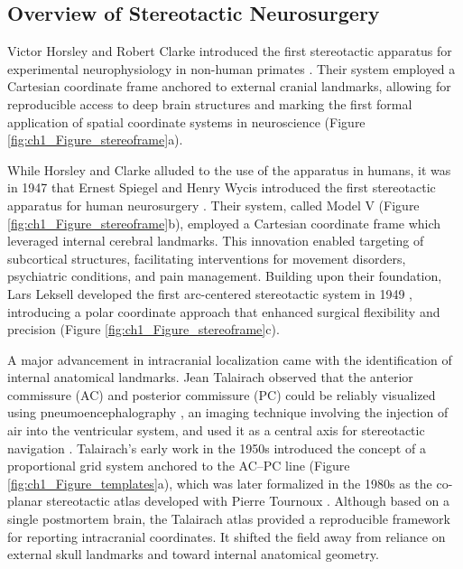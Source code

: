 \subsection{Overview of Stereotactic Neurosurgery}
Victor Horsley and Robert Clarke introduced the first stereotactic apparatus for experimental neurophysiology in non-human primates \cite{Horsley1908-om}. Their system employed a Cartesian coordinate frame anchored to external cranial landmarks, allowing for reproducible access to deep brain structures and marking the first formal application of spatial coordinate systems in neuroscience (Figure \ref{fig:ch1_Figure_stereoframe}a).

While Horsley and Clarke alluded to the use of the apparatus in humans, it was in 1947 that Ernest Spiegel and Henry Wycis introduced the first stereotactic apparatus for human neurosurgery \cite{Spiegel1947-rq}. Their system, called Model V (Figure \ref{fig:ch1_Figure_stereoframe}b), employed a Cartesian coordinate frame which leveraged internal cerebral landmarks. This innovation enabled targeting of subcortical structures, facilitating interventions for movement disorders, psychiatric conditions, and pain management. Building upon their foundation, Lars Leksell developed the first arc-centered stereotactic system in 1949 \cite{Leksell1949-wl}, introducing a polar coordinate approach that enhanced surgical flexibility and precision (Figure \ref{fig:ch1_Figure_stereoframe}c).

A major advancement in intracranial localization came with the identification of internal anatomical landmarks. Jean Talairach observed that the anterior commissure (AC) and posterior commissure (PC) could be reliably visualized using pneumoencephalography \cite{Dandy1918-os}, an imaging technique involving the injection of air into the ventricular system, and used it as a central axis for stereotactic navigation \cite{Talairach1957-eb}. Talairach’s early work in the 1950s introduced the concept of a proportional grid system anchored to the AC–PC line (Figure \ref{fig:ch1_Figure_templates}a), which was later formalized in the 1980s as the co-planar stereotactic atlas developed with Pierre Tournoux \cite{Talairach1988-wk}. Although based on a single postmortem brain, the Talairach atlas provided a reproducible framework for reporting intracranial coordinates. It shifted the field away from reliance on external skull landmarks and toward internal anatomical geometry.

